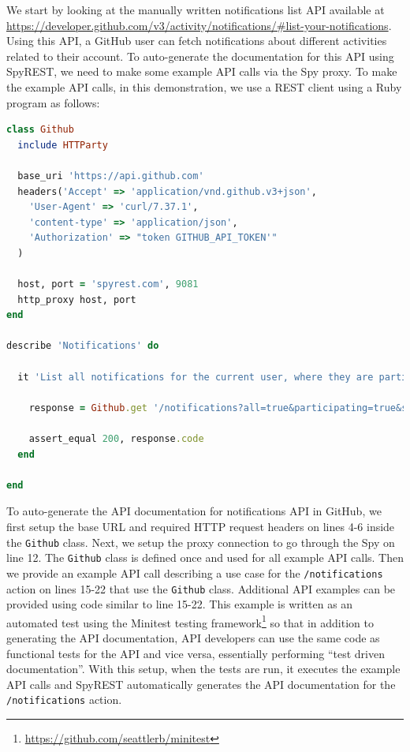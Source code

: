 \documentclass[conference]{IEEEtran}
\begin{document}
We start by looking at the manually written notifications list API available at \url{https://developer.github.com/v3/activity/notifications/#list-your-notifications}. Using this API, a GitHub user can fetch notifications about different activities related to their account. To auto-generate the documentation for this API using SpyREST, we need to make some example API calls via the Spy proxy. To make the example API calls, in this demonstration, we use a REST client using a Ruby program as follows:

\lstset{showstringspaces=false, basicstyle=\footnotesize, numbers=left, numbersep=1pt }
\begin{lstlisting}[language=ruby, breaklines=true, caption={}, label=list:ex]
class Github
  include HTTParty

  base_uri 'https://api.github.com'
  headers('Accept' => 'application/vnd.github.v3+json',
    'User-Agent' => 'curl/7.37.1',
    'content-type' => 'application/json',
    'Authorization' => "token GITHUB_API_TOKEN'"
  )

  host, port = 'spyrest.com', 9081
  http_proxy host, port
end

describe 'Notifications' do

  it 'List all notifications for the current user, where they are participating, since a time' do

    response = Github.get '/notifications?all=true&participating=true&since=2014-01-01T00:00:00Z'

    assert_equal 200, response.code
  end

end\end{lstlisting}

To auto-generate the API documentation for notifications API in GitHub, we first setup the base URL and required HTTP request headers on lines 4-6 inside the \texttt{Github} class. Next, we setup the proxy connection to go through the Spy on line 12. The \texttt{Github} class is defined once and used for all example API calls. Then we provide an example API call describing a use case for the \texttt{/notifications} action on lines 15-22 that use the \texttt{Github} class. Additional API examples can be provided using code similar to line 15-22. This example is written as an automated test using the Minitest testing framework\footnote{\url{https://github.com/seattlerb/minitest}} so that in addition to generating the API documentation, API developers can use the same code as functional tests for the API and vice versa, essentially performing ``test driven documentation''. With this setup, when the tests are run, it executes the example API calls and SpyREST automatically generates the API documentation for the \texttt{/notifications} action.
\end{document}
